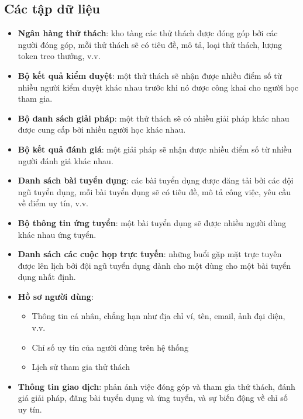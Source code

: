 \subsection{Các tập dữ liệu}
\begin{itemize}
  \item \textbf{Ngân hàng thử thách}: kho tàng các thử thách được đóng góp bởi các người đóng góp, mỗi thử thách sẽ có tiêu đề, mô tả, loại thử thách, lượng token treo thưởng, v.v.
  \item \textbf{Bộ kết quả kiểm duyệt}: một thử thách sẽ nhận được nhiều điểm số từ nhiều người kiểm duyệt khác nhau trước khi nó được công khai cho người học tham gia.
  \item \textbf{Bộ danh sách giải pháp}: một thử thách sẽ có nhiều giải pháp khác nhau được cung cấp bởi nhiều người học khác nhau.
  \item \textbf{Bộ kết quả đánh giá}: một giải pháp sẽ nhận được nhiều điểm số từ nhiều người đánh giá khác nhau.
  \item \textbf{Danh sách bài tuyển dụng}: các bài tuyển dụng được đăng tải bởi các đội ngũ tuyển dụng, mỗi bài tuyển dụng sẽ có tiêu đề, mô tả công việc, yêu cầu về điểm uy tín, v.v.
  \item \textbf{Bộ thông tin ứng tuyển}: một bài tuyển dụng sẽ được nhiều người dùng khác nhau ứng tuyển.
  \item \textbf{Danh sách các cuộc họp trực tuyến}: những buổi gặp mặt trực tuyến được lên lịch bởi đội ngũ tuyển dụng dành cho một dùng cho một bài tuyển dụng nhất định.
  \item \textbf{Hồ sơ người dùng}:
  \begin{itemize}
    \item Thông tin cá nhân, chẳng hạn như địa chỉ ví, tên, email, ảnh đại diện, v.v.
    \item Chỉ số uy tín của người dùng trên hệ thống
    \item Lịch sử tham gia thử thách
  \end{itemize}
  \item \textbf{Thông tin giao dịch}: phản ánh việc đóng góp và tham gia thử thách, đánh giá giải pháp, đăng bài tuyển dụng và ứng tuyển, và sự biến động về chỉ số uy tín.
\end{itemize}

